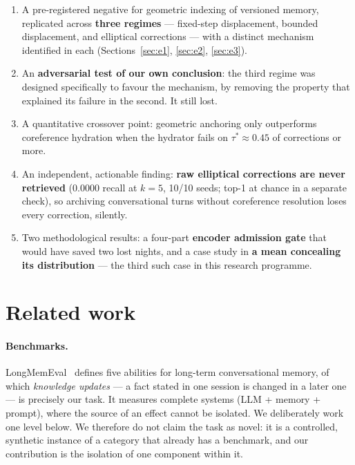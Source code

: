 \documentclass[11pt,a4paper]{article}
\begin{document}
\begin{enumerate}
\item A pre-registered negative for geometric indexing of versioned memory, replicated across
      \textbf{three regimes} --- fixed-step displacement, bounded displacement, and elliptical
      corrections --- with a distinct mechanism identified in each (Sections~\ref{sec:e1},
      \ref{sec:e2}, \ref{sec:e3}).
\item An \textbf{adversarial test of our own conclusion}: the third regime was designed specifically
      to favour the mechanism, by removing the property that explained its failure in the second.
      It still lost.
\item A quantitative crossover point: geometric anchoring only outperforms coreference hydration
      when the hydrator fails on $\tau^{*} \approx 0.45$ of corrections or more.
\item An independent, actionable finding: \textbf{raw elliptical corrections are never retrieved}
      ($0.0000$ recall at $k=5$, 10/10 seeds; top-1 at chance in a separate check), so archiving
      conversational turns without coreference resolution loses every correction, silently.
\item Two methodological results: a four-part \textbf{encoder admission gate} that would have saved
      two lost nights, and a case study in \textbf{a mean concealing its distribution} --- the third
      such case in this research programme.
\end{enumerate}

\section{Related work}

\paragraph{Benchmarks.} LongMemEval~\cite{longmemeval} defines five abilities for long-term
conversational memory, of which \emph{knowledge updates} --- a fact stated in one session is changed
in a later one --- is precisely our task. It measures complete systems (LLM + memory + prompt), where
the source of an effect cannot be isolated. We deliberately work one level below.
We therefore do not claim the task as novel: it is a controlled, synthetic instance of a category
that already has a benchmark, and our contribution is the isolation of one component within it.
\end{document}
